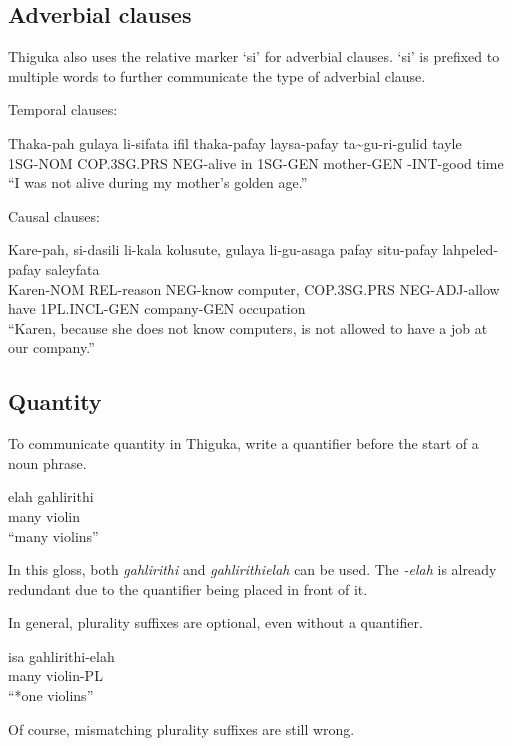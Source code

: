 \subsection{Adverbial clauses}
Thiguka also uses the relative marker `si' for adverbial clauses. `si' is prefixed to
multiple words to further communicate the type of adverbial clause.

Temporal clauses:
\begin{exe}
    \ex{} \gll{}Thaka-pah gulaya      li-sifata ifil thaka-pafay laysa-pafay ta\~{}gu-ri-gulid  tayle\\
                1SG-NOM   COP.3SG.PRS NEG-alive in   1SG-GEN     mother-GEN  \agradj{}-INT-good time\\
          \glt{}``I was not alive during my mother's golden age.''
\end{exe}

Causal clauses:
\begin{exe}
    \ex{} \gll{}Kare-pah, si-dasili  li-kala  kolusute, gulaya      li-gu-asaga   pafay situ-pafay   lahpeled-pafay saleyfata\\
    Karen-NOM REL-reason NEG-know computer, COP.3SG.PRS NEG-ADJ-allow have  1PL.INCL-GEN company-GEN    occupation\\
    \glt{}``Karen, because she does not know computers, is not allowed to have a job at our company.''
\end{exe}
\subsection{Quantity}
To communicate quantity in Thiguka, write a quantifier before the start of a noun phrase.

\begin{exe}
    \ex{} \gll{}elah gahlirithi\\
                many violin\\
          \glt{}``many violins''
\end{exe}
In this gloss, both \textit{gahlirithi} and \textit{gahlirithielah} can be used.
The \textit{-elah} is already redundant due to the quantifier being placed in front of it.

In general, plurality suffixes are optional, even without a quantifier.

\begin{exe}
    \ex{} \gll{}isa  gahlirithi-elah\\
                many violin-PL\\
          \glt{}``*one violins''
\end{exe}
Of course, mismatching plurality suffixes are still wrong.

